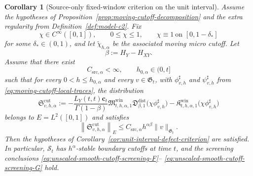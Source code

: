 \documentclass[11pt,a4paper]{amsart}
\theoremstyle{plain}
\newtheorem{corollary}[theorem]{Corollary}
\theoremstyle{definition}
\theoremstyle{remark}
\begin{document}
\begin{corollary}[Source-only fixed-window criterion on the unit interval]
\label{cor:unit-interval-source-only}
Assume the hypotheses of Proposition~\ref{prop:moving-cutoff-decomposition} and the extra regularity
from Definition~\ref{def:model-c2}. Fix
\[
\chi\in C^\infty([0,1]),
\qquad
0\le \chi\le1,
\qquad
\chi\equiv1\ \text{on }[0,1-\delta_*]
\]
for some \(\delta_*\in(0,1)\), and let \(\widetilde\chi_{h,\alpha}\) be the associated moving micro
cutoff. Let
\[
\beta:=H_Y-H_{XY}.
\]
Assume that there exist
\[
C_{\mathrm{src},\alpha}<\infty,
\qquad
h_{0,\alpha}\in(0,t]
\]
such that for every \(0<h\le h_{0,\alpha}\) and every \(v\in\mathfrak G_t\), with
\(\phi_{v,h}^{\sharp}\) and \(\psi_{v,h}^{\sharp}\) from
\eqref{eq:moving-cutoff-local-traces}, the distribution
\begin{equation}\label{eq:unit-interval-source-only-def}
\mathfrak S_{v,h,\alpha}^{\mathrm{cut}}
:=
-\frac{L_Y(t,t)\mathbf c_t}{\Gamma(1-\beta)}
\mathfrak M_{t,h,\alpha,1}^{\mathrm{win}}
\mathfrak D_{\beta,1}^{\mathrm{dist}}
\bigl(
\chi\phi_{v,h}^{\sharp}
\bigr)
-\mathfrak K_{t,h,\alpha,1}^{\mathrm{win}}
\bigl(
\chi\phi_{v,h}^{\sharp}
\bigr)
\end{equation}
belongs to \(E=L^2([0,1])\) and satisfies
\begin{equation}\label{eq:unit-interval-source-only-bound}
\left\|
\mathfrak S_{v,h,\alpha}^{\mathrm{cut}}
\right\|_{E}
\le
C_{\mathrm{src},\alpha}h^{\alpha\beta}\|v\|_{\mathfrak G_t}.
\end{equation}
Then the hypotheses of Corollary~\ref{cor:unit-interval-defect-criterion} are satisfied. In
particular, \(\mathcal S_t\) has \(h^\alpha\)-stable boundary cutoffs at time \(t\), and the
screening conclusions \eqref{eq:unscaled-smooth-cutoff-screening-F}--
\eqref{eq:unscaled-smooth-cutoff-screening-G} hold.
\end{corollary}
\end{document}
